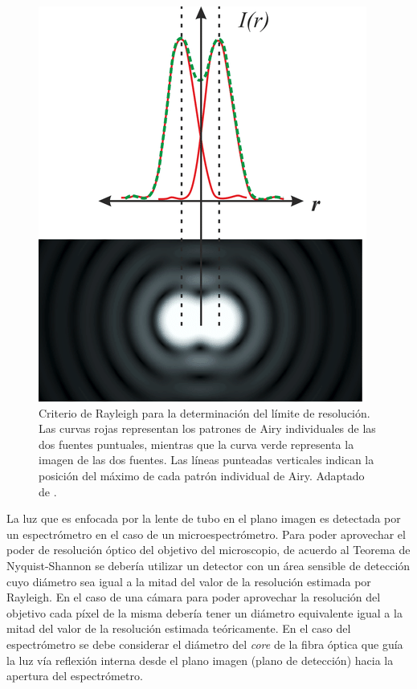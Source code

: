 \begin{figure}[H]
	\centering
	\includegraphics[scale=0.5]{Figs/microespectrometro/raylspa.png}
	\caption{Criterio de Rayleigh para la determinación del límite de resolución. Las curvas rojas representan los patrones de Airy individuales de las dos fuentes puntuales, mientras que la curva verde representa la imagen de las dos fuentes. Las líneas punteadas verticales indican la posición del máximo de cada patrón individual de Airy. Adaptado de \cite{raylsp}.}
	\label{fig:critrayspa}
\end{figure}

La luz que es enfocada por la lente de tubo en el plano imagen es detectada por un espectrómetro en el caso de un microespectrómetro. Para poder aprovechar el poder de resolución óptico del objetivo del microscopio, de acuerdo al Teorema de Nyquist-Shannon se debería utilizar un detector con un área sensible de detección cuyo diámetro sea igual a la mitad del valor de la resolución estimada por Rayleigh. En el caso de una cámara para poder aprovechar la resolución del objetivo cada píxel de la misma debería tener un diámetro equivalente igual a la mitad del valor de la resolución estimada teóricamente. En el caso del espectrómetro se debe considerar el diámetro del \textit{core} de la fibra óptica que guía la luz vía reflexión interna desde el plano imagen (plano de detección) hacia la apertura del espectrómetro.

